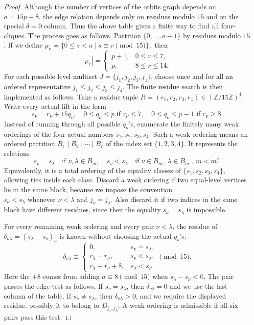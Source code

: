 \documentclass[12pt]{article}
\theoremstyle{plain}
\theoremstyle{definition}
\renewcommand{\leq}{\leqslant}
\renewcommand{\geq}{\geqslant}
\begin{document}
\begin{proof}
Although the number of vertices of the orbits graph depends on
\(a=15p+8\), the edge relation depends only on residues modulo \(15\) and on
the special \(\delta=0\) column.  Thus the above table gives a finite way to
find all four-cliques. The process goes as follows.  Partition
\(\{0,\ldots,a-1\}\) by residues modulo \(15\).  
If we define 
\(\mu_r=\{0\leq s<a\mid s\equiv r\pmod {15}\},\)
then
\[|\mu_r|=
\begin{cases}
p+1,&0\leq r\leq7,\\
p,&8\leq r\leq14.
\end{cases}
\]
For each possible level multiset \(J=\{j_1,j_2,j_3,j_4\}\), choose once and
for all an ordered representative
\(j_1\leq j_2\leq j_3\leq j_4 .\)
The finite residue search is then implemented as follows.  Take a residue
tuple
\(R=(r_1,r_2,r_3,r_4)\in(\mathbb Z/15\mathbb Z)^4.\)
Write every actual lift in the form
\[
s_\nu=r_\nu+15q_\nu,\quad
0\leq q_\nu\leq p\text{ if }r_\nu\leq7,\quad
0\leq q_\nu\leq p-1\text{ if }r_\nu\geq8.
\]
Instead of running through all possible \(q_\nu\)'s, enumerate the finitely many
weak orderings of the four actual numbers \(s_1,s_2,s_3,s_4\).  Such a weak
ordering means an ordered partition
\(B_1\mid B_2\mid\cdots\mid B_\ell\)
of the index set \(\{1,2,3,4\}\).  It represents the relations
\[
s_\nu=s_\lambda\quad\text{if }\nu,\lambda\in B_m,
\quad
s_\nu<s_\lambda\quad\text{if }\nu\in B_m,\ \lambda\in B_{m'},\ m<m'.
\]
Equivalently, it is a total ordering of the equality classes of
\(\{s_1,s_2,s_3,s_4\}\), allowing ties inside each class.
Discard a weak ordering if two equal-level vertices lie in the same block,
because we impose the convention
\(s_\nu<s_\lambda\text{ whenever } \nu<\lambda \text{ and }j_\nu=j_\lambda .\)
Also discard it if two indices in the same block have different residues,
since then the equality \(s_\nu=s_\lambda\) is impossible.

For every remaining weak ordering and every pair \(\nu<\lambda\), the residue
of \(\delta_{\nu\lambda}=(s_\lambda-s_\nu)_a\) is known without choosing the
actual \(q_\nu\)'s:
\[
\delta_{\nu\lambda}\equiv
\begin{cases}
0,& s_\nu=s_\lambda,\\
r_\lambda-r_\nu,& s_\nu<s_\lambda,\\
r_\lambda-r_\nu+8,& s_\lambda<s_\nu
\end{cases}
\pmod {15}.
\]
Here the \(+8\) comes from adding \(a\equiv8\pmod {15}\) when
\(s_\lambda-s_\nu<0\).  The pair passes the edge test as follows.  If
\(s_\nu=s_\lambda\), then \(\delta_{\nu\lambda}=0\) and we use the last column
of the table.  If \(s_\nu\neq s_\lambda\), then
\(\delta_{\nu\lambda}>0\), and we require the displayed residue, possibly
\(0\), to belong to \(D_{j_\nu,j_\lambda}\).  A weak ordering is admissible if
all six pairs pass this test.


\end{proof}
\end{document}
